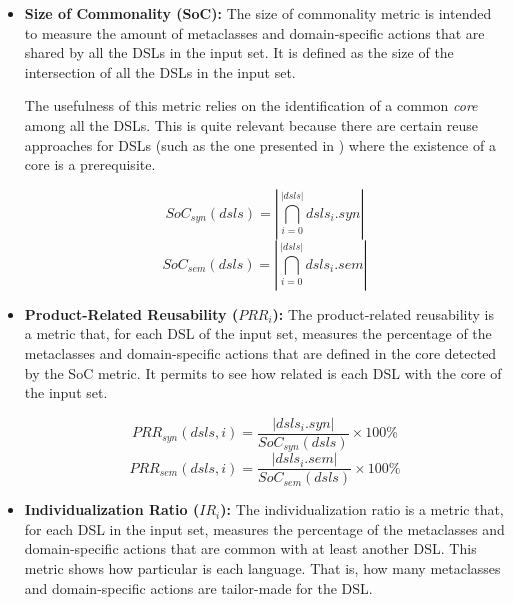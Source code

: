\begin{itemize}
\item \textbf{Size of Commonality (SoC):} The size of commonality metric is intended to measure the amount of metaclasses and domain-specific actions that are shared by all the DSLs in the input set. It is defined as the size of the intersection of all the DSLs in the input set. 

\hspace{3mm} The usefulness of this metric relies on the identification of a common \textit{core} among all the DSLs. This is quite relevant because there are certain reuse approaches for DSLs (such as the one presented in \cite{Zschaler:2010b}) where the existence of a core is a prerequisite.

\begin{equation}
  SoC_{syn}(dsls) = |\bigcap _{i=0}^{|dsls|}dsls_i.syn|
\end{equation}
\vspace{-1mm}
\begin{equation}
  SoC_{sem}(dsls) = |\bigcap _{i=0}^{|dsls|}dsls_i.sem|
\end{equation}

\vspace{1mm}
\item \textbf{Product-Related Reusability ($PRR_i$):} The product-related reusability is a metric that, for each DSL of the input set, measures the percentage of the metaclasses and domain-specific actions that are defined in the core detected by the SoC metric. It permits to see how related is each DSL with the core of the input set.

\begin{equation}
  PRR_{syn}(dsls,i) = \frac{|dsls_i.syn|}{SoC_{syn}(dsls)} \times 100\% 
\end{equation}
\vspace{-1mm}
\begin{equation}
  PRR_{sem}(dsls,i) = \frac{|dsls_i.sem|}{SoC_{sem}(dsls)} \times 100\% 
\end{equation}

\vspace{2mm}
\item \textbf{Individualization Ratio ($IR_i$):} The individualization ratio is a metric that, for each DSL in the input set, measures the percentage of the metaclasses and domain-specific actions that are common with at least another DSL. This metric shows how particular is each language. That is, how many metaclasses and domain-specific actions are tailor-made for the DSL. 


\end{itemize}
